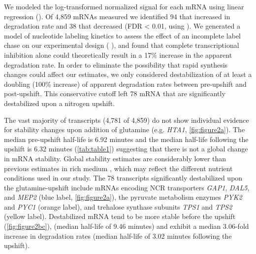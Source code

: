 We modeled the
log-transformed normalized signal for each mRNA using linear
regression ().
Of 4,859 mRNAs measured we identified 94 that increased in 
degradation rate and 38 that decreased (FDR < 0.01, using
\cite{storey2003statistical}). 
We generated a model of nucleotide
labeling kinetics to assess the effect of an incomplete label 
chase on our experimental design (  ),
 and found that complete transcriptional inhibition alone could 
theoretically result in a 17\% increase in the apparent 
degradation rate. In order to eliminate the possibility that
rapid synthesis changes could affect our estimates,
we only considered destabilization of at least a
doubling (100\% increase) of apparent degradation rates between 
pre-upshift and post-upshift.
This conservative cutoff 
left 78 mRNA that are significantly destabilized 
upon a nitrogen upshift. 

The vast majority of transcripts (4,781 of 4,859) do not show
individual evidence for stability changes upon addition of glutamine
(e.g. \textit{HTA1}, \autoref{fig:figure2a}). 
The median pre-upshift half-life is 6.92 minutes and the median
half-life following the upshift is 6.32 minutes (\autoref{tab:table1})
suggesting that there is not a global change in mRNA stability.
Global stability estimates are
considerably lower than previous estimates in rich medium
\parencite{munchel2011dynamic,neymotin2014determination,miller2011dynamic}, 
which may reflect the
different nutrient conditions used in our study. 
The 78 transcripts significantly destabilized upon the 
glutamine-upshift include
mRNAs encoding NCR transporters \textit{GAP1}, \textit{DAL5}, and
\textit{MEP2} (blue label, \autoref{fig:figure2a}), the pyruvate metabolism enzymes
\textit{PYK2} and \textit{PYC1} (orange label), and trehalose synthase
subunits \textit{TPS1} and
\textit{TPS2} (yellow label).
Destabilized mRNA tend to be more stable before the upshift
(\autoref{fig:figure2bc}),
(median half-life of 9.46 minutes) and exhibit 
a median 3.06-fold increase in degradation rates (median half-life of
3.02 minutes following the upshift). 

\label{subsection:stabilityChanges}

